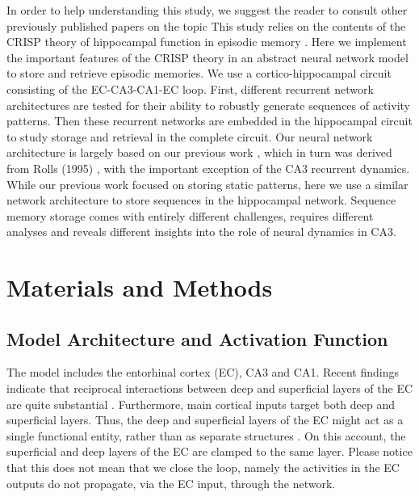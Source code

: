 \documentclass[utf8]{frontiersSCNS} %
\begin{document}
In order to help understanding this study, we suggest the reader to consult other previously published papers on the topic \cite{cheng2013crisp, neher2015memory}
%
This study relies on the contents of the CRISP theory of hippocampal function in episodic memory \cite{cheng2013crisp}. 
% 
Here we implement the important features of the CRISP theory in an abstract neural network model to store and retrieve episodic memories. We use a cortico-hippocampal circuit consisting of the EC-CA3-CA1-EC loop. 
%
First, different recurrent network architectures are tested for their ability to robustly generate sequences of activity patterns. 
%
Then these recurrent networks are embedded in the hippocampal circuit to study storage and retrieval in the complete circuit.
%
Our neural network architecture is largely based on our previous work \cite{neher2015memory}, which in turn was derived from Rolls (1995) \cite{fontanari1995model}, with the important exception of the CA3 recurrent dynamics. 
%
While our previous work focused on storing static patterns, here we use a similar network architecture to store sequences in the hippocampal network. Sequence memory storage comes with entirely different challenges, requires different analyses and reveals different insights into the role of neural dynamics in CA3. 

\section{Materials and Methods}




\subsection{Model Architecture and Activation Function}


The model includes the entorhinal cortex (EC), CA3 and CA1. 
%
%
Recent findings indicate that reciprocal interactions between deep and superficial layers of the EC are quite substantial \cite{canto2008does, van2003morphological}. Furthermore, main cortical inputs target both deep and superficial layers. Thus, the deep and superficial layers of the EC might act as a single functional entity, rather than as separate structures \cite{kloosterman2000functional}.
%
On this account, the superficial and deep layers of the EC are clamped to the same layer. Please notice that this does not mean that we close the loop, namely the activities in the EC outputs do not propagate, via the EC input, through the network.
\end{document}
